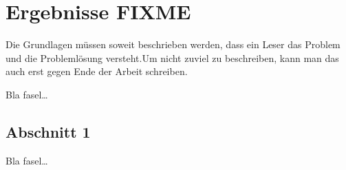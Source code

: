 
\chapter{Ergebnisse FIXME}
\label{ch:Ergebnisse}
Die Grundlagen müssen soweit beschrieben
werden, dass ein Leser das Problem und
die Problemlösung  versteht.Um nicht zuviel 
zu beschreiben, kann man das auch erst gegen 
Ende der Arbeit schreiben.

Bla fasel\ldots

\section{Abschnitt 1}
\label{ch:Ergebnisse:sec:Abschnitt1}

Bla fasel\ldots

